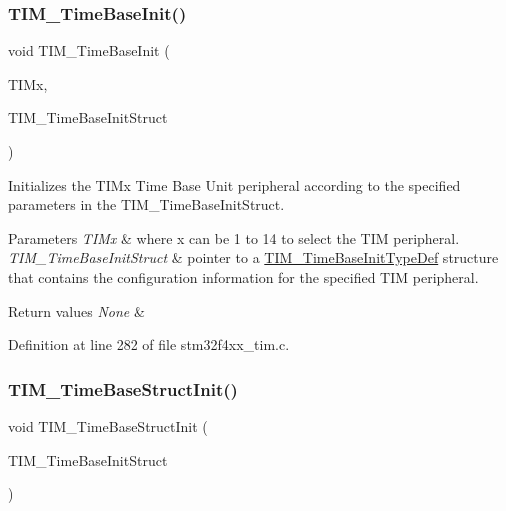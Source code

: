 \subsubsection{\texorpdfstring{T\+I\+M\+\_\+\+Time\+Base\+Init()}{TIM\_TimeBaseInit()}}
{\footnotesize\ttfamily void T\+I\+M\+\_\+\+Time\+Base\+Init (\begin{DoxyParamCaption}\item[{\hyperlink{struct_t_i_m___type_def}{T\+I\+M\+\_\+\+Type\+Def} $\ast$}]{T\+I\+Mx,  }\item[{\hyperlink{struct_t_i_m___time_base_init_type_def}{T\+I\+M\+\_\+\+Time\+Base\+Init\+Type\+Def} $\ast$}]{T\+I\+M\+\_\+\+Time\+Base\+Init\+Struct }\end{DoxyParamCaption})}



Initializes the T\+I\+Mx Time Base Unit peripheral according to the specified parameters in the T\+I\+M\+\_\+\+Time\+Base\+Init\+Struct. 


\begin{DoxyParams}{Parameters}
{\em T\+I\+Mx} & where x can be 1 to 14 to select the T\+IM peripheral. \\
\hline
{\em T\+I\+M\+\_\+\+Time\+Base\+Init\+Struct} & pointer to a \hyperlink{struct_t_i_m___time_base_init_type_def}{T\+I\+M\+\_\+\+Time\+Base\+Init\+Type\+Def} structure that contains the configuration information for the specified T\+IM peripheral. \\
\hline
\end{DoxyParams}

\begin{DoxyRetVals}{Return values}
{\em None} & \\
\hline
\end{DoxyRetVals}


Definition at line 282 of file stm32f4xx\+\_\+tim.\+c.

\mbox{\label{group___t_i_m___group1_ga1556a0b9a5d53506875fd7de0cbc6b1f}} 
\subsubsection{\texorpdfstring{T\+I\+M\+\_\+\+Time\+Base\+Struct\+Init()}{TIM\_TimeBaseStructInit()}}
{\footnotesize\ttfamily void T\+I\+M\+\_\+\+Time\+Base\+Struct\+Init (\begin{DoxyParamCaption}\item[{\hyperlink{struct_t_i_m___time_base_init_type_def}{T\+I\+M\+\_\+\+Time\+Base\+Init\+Type\+Def} $\ast$}]{T\+I\+M\+\_\+\+Time\+Base\+Init\+Struct }\end{DoxyParamCaption})}



